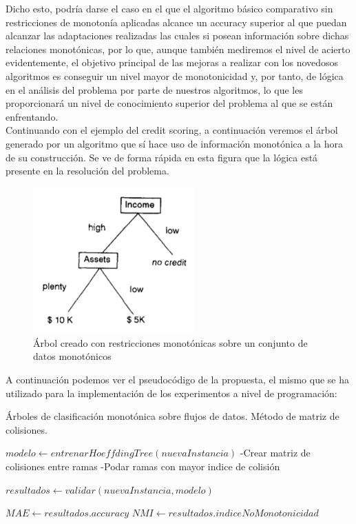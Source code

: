 Dicho esto, podría darse el caso en el que el algoritmo básico comparativo sin restricciones de monotonía aplicadas alcance un accuracy superior al que puedan alcanzar las adaptaciones realizadas las cuales si posean información sobre dichas relaciones monotónicas, por lo que, aunque también mediremos el nivel de acierto evidentemente, el objetivo principal de las mejoras a realizar con los novedosos algoritmos es conseguir un nivel mayor de monotonicidad y, por tanto, de lógica en el análisis del problema por parte de nuestros algoritmos, lo que les proporcionará un nivel de conocimiento superior del problema al que se están enfrentando.\\

Continuando con el ejemplo del credit scoring, a continuación veremos el árbol generado por un algoritmo que sí hace uso de información monotónica a la hora de su construcción. Se ve de forma rápida en esta figura que la lógica está presente en la resolución del problema.

\begin{figure}[H]
	\centering
	\includegraphics[width=0.55\textwidth]{imagenes/arbolBueno} 
	\caption{Árbol creado con restricciones monotónicas sobre un conjunto de datos monotónicos \cite{ref14}}
\end{figure}

A continuación podemos ver el pseudocódigo de la propuesta, el mismo que se ha utilizado para la implementación de los experimentos
a nivel de programación:

\begin{algorithm}[H]
	\caption{Árboles de clasificación monotónica sobre flujos de datos. Método de matriz de colisiones.}\label{euclid}
	\begin{algorithmic}[1]
			\State $modelo \gets entrenarHoeffdingTree(nuevaInstancia)$
						\State -Crear matriz de colisiones entre ramas
						\State -Podar ramas con mayor indice de colisión
				   \EndIf
		\EndWhile
		\EndProcedure
		
		\State $resultados \gets validar(nuevaInstancia, modelo)$
		\EndWhile
		
		\State $MAE \gets resultados.accuracy$
		\State $NMI \gets resultados.indiceNoMonotonicidad$
		
		\EndProcedure
	\end{algorithmic}
\end{algorithm}

